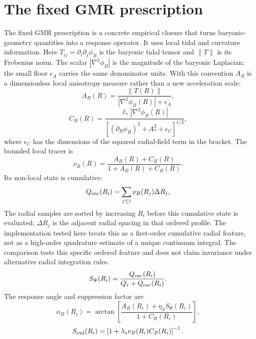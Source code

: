 ﻿\documentclass[twocolumn]{aastex631}
\begin{document}
\section{The fixed GMR prescription}
The fixed GMR prescription is a concrete empirical closure that turns baryonic-geometry quantities into a response operator.  It uses local tidal and curvature information.  Here $T_{ij}=\partial_i\partial_j\phi_B$ is the baryonic tidal tensor and $\|T\|$ is its Frobenius norm.  The scalar $|\nabla^2\phi_B|$ is the magnitude of the baryonic Laplacian; the small floor $\epsilon_A$ carries the same denominator units.  With this convention $A_B$ is a dimensionless local anisotropy measure rather than a new acceleration scale:
\begin{equation}
A_B(R)=\frac{\|T(R)\|}{|\nabla^2\phi_B(R)|+\epsilon_A},
\end{equation}
\begin{equation}
C_B(R)=
\frac{\ell_*|\nabla^2\phi_B(R)|}
{\left[(\partial_R\phi_B)^2+A_*^2+\epsilon_C\right]^{1/2}},
\end{equation}
where $\epsilon_C$ has the dimensions of the squared radial-field term in the bracket.  The bounded local tracer is
\begin{equation}
\nu_B(R)=\frac{A_B(R)+C_B(R)}{1+A_B(R)+C_B(R)} .
\end{equation}
Its non-local state is cumulative:
\begin{equation}
Q_{\rm enc}(R_i)=\sum_{j\le i}\nu_B(R_j)\Delta R_j,
\end{equation}
The radial samples are sorted by increasing $R_i$ before this cumulative state is evaluated; $\Delta R_j$ is the adjacent radial spacing in that ordered profile.  The implementation tested here treats this as a first-order cumulative radial feature, not as a high-order quadrature estimate of a unique continuum integral.  The comparison tests this specific ordered feature and does not claim invariance under alternative radial integration rules.
\begin{equation}
S_\Psi(R_i)=
\frac{Q_{\rm enc}(R_i)}{Q_*+Q_{\rm enc}(R_i)} .
\end{equation}
The response angle and suppression factor are
\begin{equation}
\alpha_B(R_i)=\arctan
\left[
\frac{A_B(R_i)+\eta_S S_\Psi(R_i)}{1+C_B(R_i)}
\right],
\end{equation}
\begin{equation}
S_{\rm rad}(R_i)=
\left[1+\lambda_s\nu_B(R_i)C_B(R_i)\right]^{-1} .
\end{equation}
\end{document}
